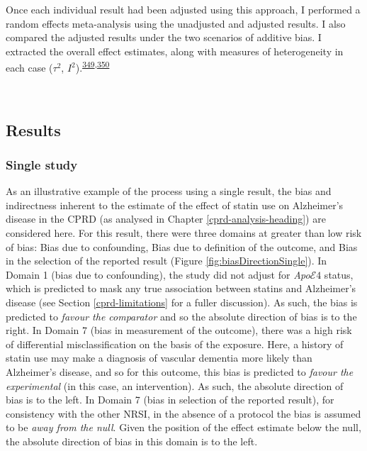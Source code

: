 \documentclass[a4paper, twoside]{templates/ociamthesis}
\begin{document}
Once each individual result had been adjusted using this approach, I performed a random effects meta-analysis using the unadjusted and adjusted results. I also compared the adjusted results under the two scenarios of additive bias. I extracted the overall effect estimates, along with measures of heterogeneity in each case (\(\tau^2\), \(I^2\)).\textsuperscript{\protect\hyperlink{ref-higgins2003}{349},\protect\hyperlink{ref-higgins2008}{350}}

~

\hypertarget{quant-tri-results}{%
\subsection{Results}\label{quant-tri-results}}

\hypertarget{single-study}{%
\subsubsection{Single study}\label{single-study}}

As an illustrative example of the process using a single result, the bias and indirectness inherent to the estimate of the effect of statin use on Alzheimer's disease in the CPRD (as analysed in Chapter \ref{cprd-analysis-heading}) are considered here. For this result, there were three domains at greater than low risk of bias: Bias due to confounding, Bias due to definition of the outcome, and Bias in the selection of the reported result (Figure \ref{fig:biasDirectionSingle}). In Domain 1 (bias due to confounding), the study did not adjust for \emph{Apo}\(\mathcal{E}4\) status, which is predicted to mask any true association between statins and Alzheimer's disease (see Section \ref{cprd-limitations} for a fuller discussion). As such, the bias is predicted to \emph{favour the comparator} and so the absolute direction of bias is to the right. In Domain 7 (bias in measurement of the outcome), there was a high risk of differential misclassification on the basis of the exposure. Here, a history of statin use may make a diagnosis of vascular dementia more likely than Alzheimer's disease, and so for this outcome, this bias is predicted to \emph{favour the experimental} (in this case, an intervention). As such, the absolute direction of bias is to the left. In Domain 7 (bias in selection of the reported result), for consistency with the other NRSI, in the absence of a protocol the bias is assumed to be \emph{away from the null}. Given the position of the effect estimate below the null, the absolute direction of bias in this domain is to the left.
\end{document}
